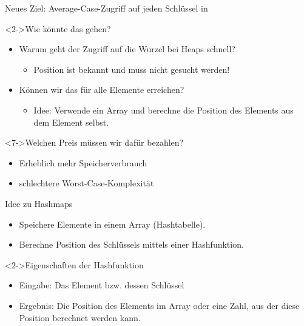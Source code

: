 \begin{frame}
    \begin{block}{Neues Ziel: Average-Case-Zugriff auf jeden Schlüssel in \alert{\oconst}}
    \end{block}
    \begin{block}<2->{Wie könnte das gehen?}
        \begin{itemize}
            \item<3-> Warum geht der Zugriff auf die Wurzel bei Heaps schnell?
            \begin{itemize}
                \item<4-> Position ist bekannt und muss nicht gesucht werden!
            \end{itemize}
            \item<5-> Können wir das für alle Elemente erreichen?
            \begin{itemize}
                \item<6-> Idee: Verwende ein Array und berechne
                      die Position des Elements aus dem Element selbst.
            \end{itemize}
        \end{itemize}
    \end{block}
    \begin{block}<7->{Welchen Preis müssen wir dafür bezahlen?}
        \begin{itemize}
            \item<8-> Erheblich mehr Speicherverbrauch 
            \item<8-> schlechtere Worst-Case-Komplexität
        \end{itemize}
    \end{block}
\end{frame}

\begin{frame}
    \begin{block}{Idee zu Hashmaps}
        \begin{itemize}
            \item Speichere Elemente in einem Array (\alert{Hashtabelle}).
            \item Berechne Position des Schlüssels mittels einer \alert{Hashfunktion}.
        \end{itemize}
    \end{block}
    \begin{block}<2->{Eigenschaften der Hashfunktion}
        \begin{itemize}
            \item Eingabe: Das Element bzw. dessen Schlüssel
            \item Ergebnis: Die Position des Elements im Array oder eine Zahl,
                  aus der diese Position berechnet werden kann.
        \end{itemize}
    \end{block}
\end{frame}

